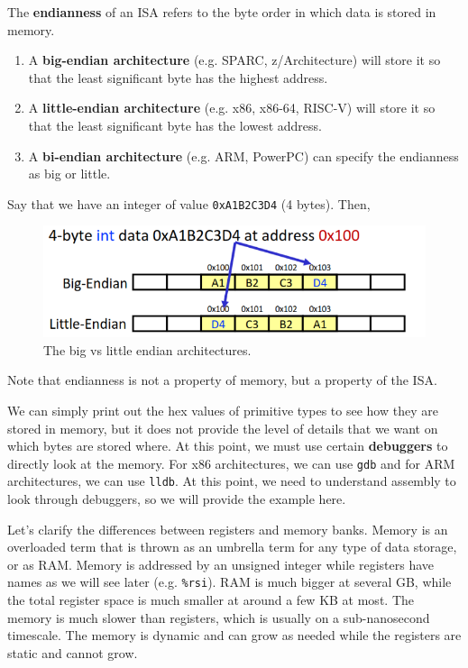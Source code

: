  \begin{definition}
    The \textbf{endianness} of an ISA refers to the byte order in which data is stored in memory. 
    \begin{enumerate} 
      \item A \textbf{big-endian architecture} (e.g. SPARC, z/Architecture) will store it so that the least significant byte has the highest address.
      \item A \textbf{little-endian architecture} (e.g. x86, x86-64, RISC-V) will store it so that the least significant byte has the lowest address. 
      \item A \textbf{bi-endian architecture} (e.g. ARM, PowerPC) can specify the endianness as big or little. 
    \end{enumerate}

    Say that we have an integer of value \texttt{0xA1B2C3D4} (4 bytes). Then, 
    \begin{figure}[H]
      \centering 
      \includegraphics[scale=0.4]{img/endianness.png}
      \caption{The big vs little endian architectures. } 
      \label{fig:endianness}
    \end{figure}
  \end{definition}
  
  Note that endianness is not a property of memory, but a property of the ISA. 

  \begin{example}
    We can simply print out the hex values of primitive types to see how they are stored in memory, but it does not provide the level of details that we want on which bytes are stored where. At this point, we must use certain \textbf{debuggers} to directly look at the memory. For x86 architectures, we can use \texttt{gdb} and for ARM architectures, we can use \texttt{lldb}. At this point, we need to understand assembly to look through debuggers, so we will provide the example here. 
  \end{example}

  Let's clarify the differences between registers and memory banks. Memory is an overloaded term that is thrown as an umbrella term for any type of data storage, or as RAM. Memory is addressed by an unsigned integer while registers have names as we will see later (e.g. \texttt{\%rsi}). RAM is much bigger at several GB, while the total register space is much smaller at around a few KB at most. The memory is much slower than registers, which is usually on a sub-nanosecond timescale. The memory is dynamic and can grow as needed while the registers are static and cannot grow.

